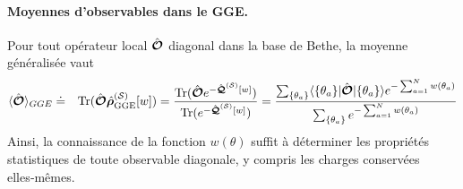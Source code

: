\paragraph{Moyennes d'observables dans le GGE.}
Pour tout opérateur local $\hat{\bm{\mathcal{O}}}$ diagonal dans la base de Bethe,
la moyenne généralisée vaut
\begin{eqnarray}\label{chap.2.moyenne.1}
	\langle \hat{\bm{\mathcal{O}}}\rangle_{GGE} & \doteq & \displaystyle  \text{Tr} (\hat{\bm{\mathcal{O}}}\hat{\bm{\rho}}^{(\mathcal{S})}_{\mathrm{GGE}}[w]) = \frac{\text{Tr} (\hat{\bm{\mathcal{O}}}e^{-\hat{\bm{\mathcal{Q}}}^{(\mathcal{S})}[w]})}{\text{Tr} (e^{-\hat{\bm{\mathcal{Q}}}^{(\mathcal{S})}[w]})}	 = \frac{\sum_{\{\theta_a \}} \langle  \{ \theta_a\}  \vert   \hat{\bm{\mathcal{O}}} \vert \{ \theta_a\} \rangle e^{- \sum_{a = 1}^N w(\theta_a) }  }{\sum_{\{\theta_a  \}} e^{- \sum_{a = 1}^N  w(\theta_a) } }
\end{eqnarray}
Ainsi, la connaissance de la fonction $w(\theta)$ suffit à déterminer
les propriétés statistiques de toute observable diagonale,
y compris les charges conservées elles‑mêmes.	
	

